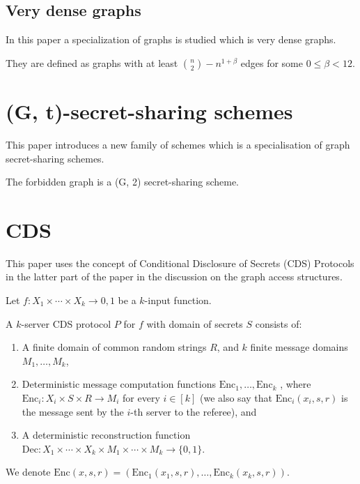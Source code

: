 \subsection{Very dense graphs}

In this paper a specialization of graphs is studied which is very dense graphs.

They are defined as graphs with at least $\binom{n}{2} - n^{1 + \beta }$ edges for some $0 \le \beta < 12$.

\section{(G, t)-secret-sharing schemes}

This paper introduces a new family of schemes which is a specialisation of graph secret-sharing schemes.



The forbidden graph is a (G, 2) secret-sharing scheme.

\section{CDS}

This paper uses the concept of Conditional Disclosure of Secrets (CDS) Protocols in the latter part of the paper in the discussion on the graph access structures.

Let $f : X_1 \times \cdots \times X_k \rightarrow {0, 1}$ be a $k$-input function.

A $k$-server CDS protocol $P$ for $f$ with domain of secrets $S$ consists of:

\begin{enumerate}
    \item A finite domain of common random strings $R$, and $k$ finite message domains
    $M_1 , \ldots , M_k$,
    \item Deterministic message computation functions $\text{Enc}_1 , \ldots , \text{Enc}_k$ ,
    where $\text{Enc}_i : X_i \times S \times R \rightarrow M_i$ for every $i \in [k]$ (we also say that $\text{Enc}_i (x_i , s, r)$ is the
    message sent by the $i$-th server to the referee), and
    \item A deterministic reconstruction function $\text{Dec} : X_1 \times \cdots \times X_k \times M_1 \times \cdots \times M_k \rightarrow \{0, 1\}$.
\end{enumerate}

We denote $\text{Enc}(x, s, r) = (\text{Enc}_1 (x_1 , s, r), \ldots, \text{Enc}_k(x_k , s, r))$.


